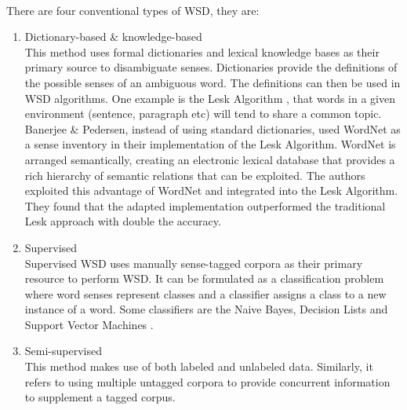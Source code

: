 \paragraph{}
There are four conventional types of WSD, they are:
\begin{enumerate}
\item Dictionary-based \& knowledge-based \\
This method uses formal dictionaries and lexical knowledge bases as their primary source to disambiguate senses. Dictionaries provide the definitions of the possible senses of an ambiguous word. The definitions can then be used in WSD algorithms. One example is the Lesk Algorithm \cite{lesk}, that words in a given environment (sentence, paragraph etc) will tend to share a common topic. Banerjee \& Pedersen, instead of using standard dictionaries,  used WordNet \cite{wordnet} as a sense inventory in their implementation of the Lesk Algorithm. WordNet is arranged semantically, creating an electronic lexical database that provides a rich hierarchy of semantic relations that can be exploited. The authors exploited this advantage of WordNet and integrated into the Lesk Algorithm. They found that the adapted implementation outperformed the traditional Lesk approach with double the accuracy.
\item Supervised \\%
Supervised WSD uses manually sense-tagged corpora as their primary resource to perform WSD. It can be formulated as a classification problem where word senses represent classes and a classifier assigns a class to a new instance of a word. Some classifiers are the Naive Bayes, Decision Lists \cite{supervisedmethods} and Support Vector Machines \cite{svm}.
\item Semi-supervised \\
This method makes use of both labeled and unlabeled data. Similarly, it refers to using multiple untagged corpora to provide concurrent information to supplement a tagged corpus.

\end{enumerate}
